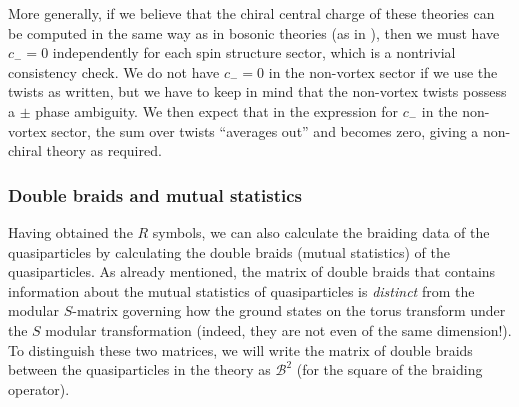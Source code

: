 \documentclass[12pt,a4paper]{article}
\newcommand{\mcb}{\mathcal{B}}
\begin{document}
More generally, if we believe that the chiral central charge of these theories can be computed in the same 
way as in bosonic theories (as in \cite{cano2014}), then we must have $c_- =0$ independently 
for each spin structure sector, which is a nontrivial consistency check. We do not have $c_-=0$ in the 
non-vortex sector if we use the twists as written, but we have to keep in mind that the 
non-vortex twists possess a $\pm$ phase ambiguity. We then expect that in the 
expression for $c_-$ in the non-vortex sector, the sum over twists ``averages out'' and becomes zero, 
giving a non-chiral theory as required. 


\subsubsection{Double braids and mutual statistics}

Having obtained the $R$ symbols, we can also calculate the braiding data of the quasiparticles by calculating 
the double braids (mutual statistics) of the quasiparticles. 
As already mentioned, the matrix of double braids that contains information about the mutual statistics of quasiparticles is {\it distinct} from the modular $S$-matrix governing how the ground states on the torus transform under the $S$ modular transformation (indeed, they are not even of the same dimension!). 
To distinguish these two matrices, we will write the matrix of double braids between the 
quasiparticles in the theory as $\mcb^2$ (for the square of the braiding operator). 
\end{document}
